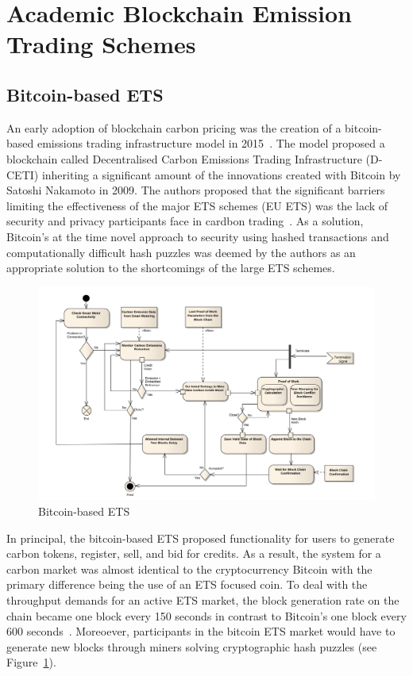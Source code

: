 \section{Academic Blockchain Emission Trading Schemes}
\subsection{Bitcoin-based ETS}
An early adoption of blockchain carbon pricing was the
creation of a bitcoin-based emissions trading infrastructure model
in 2015~\cite{vic15}. The model proposed a blockchain called
Decentralised Carbon Emissions Trading Infrastructure (D-CETI)
inheriting a significant amount of the innovations created with
Bitcoin by Satoshi Nakamoto in 2009. The authors proposed that
the significant barriers limiting the effectiveness of the
major ETS schemes (EU ETS) was the lack of security and privacy
participants face in cardbon trading~\cite{vic15}. As a solution,
Bitcoin's at the time novel approach to security using hashed
transactions and computationally difficult hash puzzles was deemed by the
authors as an appropriate solution to the shortcomings of
the large ETS schemes.


\begin{figure}[ht]
    \centering
    \includegraphics[scale=0.38]{photos/bitcoin.png}
    \caption{Bitcoin-based ETS}
    \label{fig:btc}
\end{figure}

In principal, the bitcoin-based ETS proposed functionality for
users to generate carbon tokens, register, sell,
and bid for credits. As a result, the system for a carbon market
was almost identical to the cryptocurrency Bitcoin with the
primary difference being the use of an ETS focused coin.
To deal with the throughput demands for an active ETS market,
the block generation rate on the chain became one block
every 150 seconds in contrast to Bitcoin's one block every
600 seconds~\cite{vic15}. Moreoever, participants in the bitcoin ETS market
would have to generate new blocks through miners solving cryptographic hash
puzzles (see Figure~\ref{fig:btc}).

